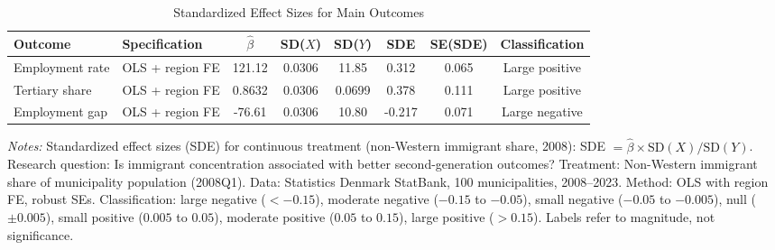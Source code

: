 \begin{table}[H]
\centering
\caption{Standardized Effect Sizes for Main Outcomes}
\label{tab:sde}
\begin{adjustbox}{max width=\textwidth}
\small
\begin{tabular}{llcccccc}
\toprule
Outcome & Specification & $\hat{\beta}$ & SD($X$) & SD($Y$) & SDE & SE(SDE) & Classification \\
\midrule
Employment rate & OLS + region FE & 121.12 & 0.0306 & 11.85 & 0.312 & 0.065 & Large positive \\
Tertiary share & OLS + region FE & 0.8632 & 0.0306 & 0.0699 & 0.378 & 0.111 & Large positive \\
Employment gap & OLS + region FE & -76.61 & 0.0306 & 10.80 & -0.217 & 0.071 & Large negative \\
\bottomrule
\end{tabular}
\end{adjustbox}
\par\vspace{0.3em}
\parbox{\textwidth}{\scriptsize \emph{Notes:} Standardized effect sizes (SDE) for continuous treatment (non-Western immigrant share, 2008): SDE $= \hat{\beta} \times \text{SD}(X) / \text{SD}(Y)$. Research question: Is immigrant concentration associated with better second-generation outcomes? Treatment: Non-Western immigrant share of municipality population (2008Q1). Data: Statistics Denmark StatBank, 100 municipalities, 2008--2023. Method: OLS with region FE, robust SEs. Classification: large negative ($< -0.15$), moderate negative ($-0.15$ to $-0.05$), small negative ($-0.05$ to $-0.005$), null ($\pm 0.005$), small positive ($0.005$ to $0.05$), moderate positive ($0.05$ to $0.15$), large positive ($> 0.15$). Labels refer to magnitude, not significance.}
\end{table}
